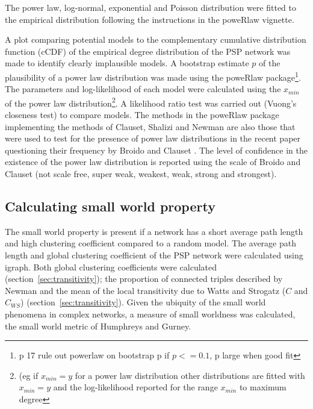 The power law, log-normal, exponential and Poisson distribution were fitted to the empirical distribution following the instructions in the poweRlaw\cite{gillespie2015fitting} vignette.

A plot comparing potential models to the complementary cumulative distribution function (cCDF) of the empirical degree distribution of the PSP network was made to identify clearly implausible models. A bootstrap estimate $p$ of the plausibility of a power law distribution was made using the poweRlaw package\footnote{p 17 rule out powerlaw on bootstrap p if $p<=0.1$, p large when good fit}. The parameters and log-likelihood of each model were calculated using the $x_{min}$ of the power law distribution\footnote{(eg if $x_{min}=y$ for a power law distribution other distributions are fitted with $x_{min}=y$  and the log-likelihood reported for the range $x_{min}$ to maximum degree}. A likelihood ratio test was carried out (Vuong's closeness test) to compare models\cite{vuong1989likelihood}. The methods in the poweRlaw package\cite{gillespie2015fitting} implementing the methods of Clauset, Shalizi and Newman \cite{clauset2009power} are also those that were used to test for the presence of power law distributions in the recent paper questioning their frequency by Broido and Clauset \cite{broido2019scale}. The level of confidence in the existence of the power law distribution is reported using the scale of Broido and Clauset (not scale free, super weak, weakest, weak, strong and strongest)\cite{broido2019scale}.

\subsection{Calculating small world property}
\label{sec:small world methods}

The small world property is present if a network has a short average path length and high clustering coefficient compared to a random model. The average path length and global clustering coefficient of the PSP network were calculated using igraph. Both global clustering coefficients were calculated (section~\ref{sec:transitivity}); the proportion of connected triples described by Newman\cite{newman2002random} and the mean of the local transitivity due to Watts and Strogatz ($C$ and $C_{WS}$) (section~\ref{sec:transitivity})\cite{watts1998collective}. Given the ubiquity of the small world phenomena in complex networks\cite{newman2018networks}, a measure of small worldness was calculated,  the small world metric of Humphreys and Gurney\cite{humphries2008network}.

